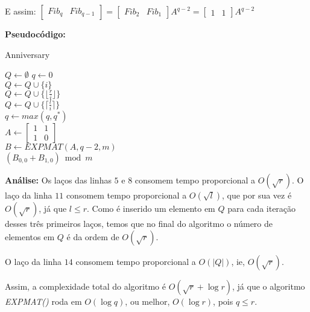 E assim:
$
\begin{bmatrix}
       Fib_q & Fib_{q-1}
\end{bmatrix}
=
\begin{bmatrix}
       Fib_{2} & Fib_{1}
\end{bmatrix}
A^{q-2}
=
\begin{bmatrix}
       1 & 1
\end{bmatrix}
A^{q-2}
$
\newline


\textbf{Pseudocódigo:}

\begin{algorithm}
\caption{Anniversary}
\begin{algorithmic}[1]

\State $Q \gets \emptyset$
\State $q \gets 0$
\\
\State $Q \gets Q\cup\{i\}$
\EndFor
\\
\State $Q \gets Q\cup\{\lfloor \frac{r}{i} \rfloor \}$
\EndFor
\\
\State $Q \gets Q\cup\{\lceil \frac{l}{i} \rceil \}$
\EndFor
\\
\State $q \gets max(q, q^*)$
\EndIf
\EndFor
\\
\State $A \gets 
\begin{bmatrix}
       1 & 1           \\[0.3em]
       1 & 0
\end{bmatrix}
$
\\
\State $B \gets EXPMAT(A, q-2, m) $
\\
\State \Return $(B_{0,0}+B_{1,0}) \bmod m$
\EndProcedure
\end{algorithmic}
\end{algorithm}


\textbf{Análise:}
Os laços das linhas $5$ e $8$ consomem tempo proporcional a $O(\sqrt{r})$. O laço da linha $11$ consomem tempo proporcional a $O(\sqrt{l})$, que por sua vez é $O(\sqrt{r})$, já que $l\leq r$. Como é inserido um elemento em $Q$ para cada iteração desses três primeiros laços, temos que no final do algoritmo o número de elementos em $Q$ é da ordem de $O(\sqrt{r})$.

O laço da linha $14$ consomem tempo proporcional a $O(|Q|)$, ie, $O(\sqrt{r})$.

Assim, a complexidade total do algoritmo é $O(\sqrt{r} + \log r)$, já que o algoritmo \textit{EXPMAT()} roda em $O(\log q)$, ou melhor, $O(\log r)$, pois $q \leq r$. 
